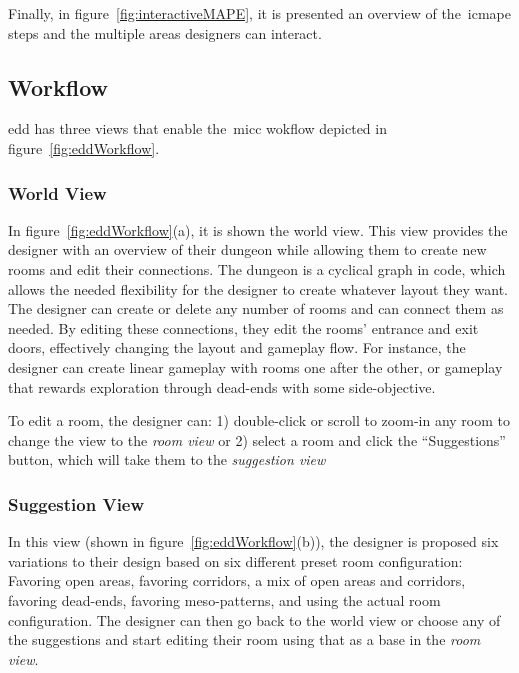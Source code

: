 Finally, in figure~\ref{fig:interactiveMAPE}, it is presented an overview of the~\acrshort{icmape} steps and the multiple areas designers can interact.



\subsection{Workflow}

\acrshort{edd} has three views that enable the~\acrshort{micc} wokflow depicted in figure~\ref{fig:eddWorkflow}.

\subsubsection{World View}

In figure~\ref{fig:eddWorkflow}(a), it is shown the world view. This view provides the designer with an overview of their dungeon while allowing them to create new rooms and edit their connections. The dungeon is a cyclical graph in code, which allows the needed flexibility for the designer to create whatever layout they want. The designer can create or delete any number of rooms and can connect them as needed. By editing these connections, they edit the rooms' entrance and exit doors, effectively changing the layout and gameplay flow. For instance, the designer can create linear gameplay with rooms one after the other, or gameplay that rewards exploration through dead-ends with some side-objective. 

To edit a room, the designer can: 1) double-click or scroll to zoom-in any room to change the view to the \emph{room view} or 2) select a room and click the ``Suggestions'' button, which will take them to the \emph{suggestion view}

\subsubsection{Suggestion View}

In this view (shown in figure~\ref{fig:eddWorkflow}(b)), the designer is proposed six variations to their design based on six different preset room configuration: Favoring open areas, favoring corridors, a mix of open areas and corridors, favoring dead-ends, favoring meso-patterns, and using the actual room configuration. The designer can then go back to the world view or choose any of the suggestions and start editing their room using that as a base in the \emph{room view}.


